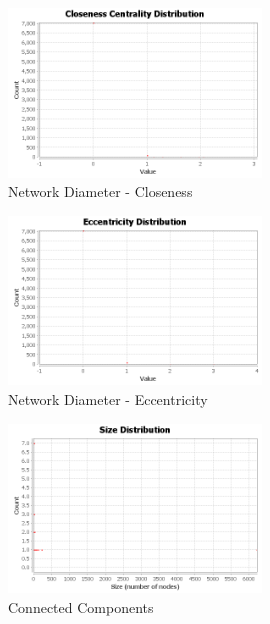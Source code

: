 \documentclass[letterpaper,11pt]{report}
\begin{document}
\begin{savenotes}
\begin{figure}[htbp]
	\centering
		\includegraphics[width=0.60\textwidth]{ClosenessCentralityDistribution.png}
	\caption{Network Diameter - Closeness}
	\label{fig:Closeness Centrality Distribution}
\end{figure}

\begin{figure}[htbp]
	\centering
		\includegraphics[width=0.60\textwidth]{EccentricityDistribution.png}
	\caption{Network Diameter - Eccentricity}
	\label{fig:Eccentricity Distribution}
\end{figure}



\begin{figure}[htbp]
	\centering
		\includegraphics[width=0.60\textwidth]{cc-size-distribution.png}
	\caption{Connected Components}
	\label{fig:cc-size-distribution}
\end{figure}


\end{savenotes}
\end{document}
